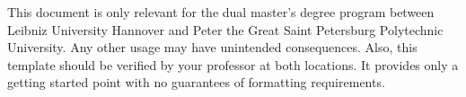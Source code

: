 \label{sec:scope_and_limitations}
This document is only relevant for the dual master's degree program between Leibniz University Hannover and Peter the Great Saint Petersburg Polytechnic University. Any other usage may have unintended consequences. Also, this template should be verified by your professor at both locations. It provides only a getting started point with no guarantees of formatting requirements.
